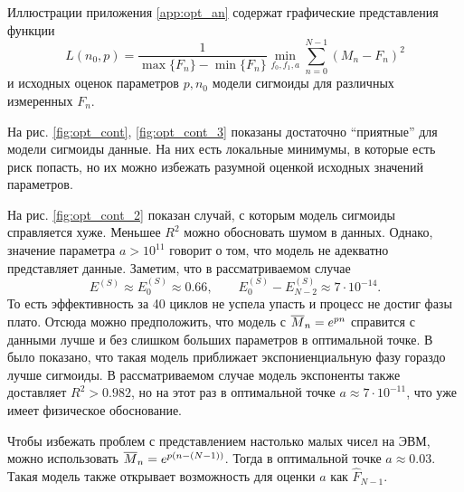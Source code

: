 Иллюстрации приложения \ref{app:opt_an} содержат графические представления
функции
\begin{equation}\label{eq:opt_fun}
  L(n_0,p)=\frac{1}{\max\{F_{n}\}-\min\{F_{n}\}}\min_{f_0,f_1,a}
  \sum_{n=0}^{N-1}(M_{n}-F_{n})^{2}
\end{equation}
и исходных оценок параметров $p,n_0$ модели сигмоиды для различных измеренных
$F_{n}$.

На рис. \ref{fig:opt_cont}, \ref{fig:opt_cont_3} показаны достаточно
\enquote{приятные} для модели сигмоиды данные. На них есть локальные минимумы,
в которые есть риск попасть, но их можно избежать разумной оценкой исходных
значений параметров.

На рис. \ref{fig:opt_cont_2} показан случай, с которым модель сигмоиды
справляется хуже. Меньшее $R^{2}$ можно обосновать шумом в данных. Однако,
значение параметра $a>10^{11}$ говорит о том, что модель не адекватно
представляет данные. Заметим, что в рассматриваемом случае
\[
  E^{(S)}\approx E^{(S)}_0\approx 0.66,\qquad
  E^{(S)}_{0}-E^{(S)}_{N-2}\approx 7\cdot 10^{-14}.
\]
То есть эффективность за 40 циклов не успела упасть и процесс не достиг фазы
плато. Отсюда можно предположить, что модель с $\overline{M}_{n}=e^{pn}$ справится с
данными лучше и без слишком больших параметров в оптимальной точке. В
\cite{zhaoComprehensiveAlgorithmQuantitative2005} было показано, что такая
модель приближает экспониенциальную фазу гораздо лучше сигмоиды. В
рассматриваемом случае модель экспоненты также доставляет $R^{2}>0.982$, но на
этот раз в оптимальной точке $a\approx 7\cdot 10^{-11}$, что уже имеет
физическое обоснование.

Чтобы избежать проблем с представлением настолько малых чисел на ЭВМ, можно
использовать $\overline{M}_{n}=e^{p(n-(N-1))}$. Тогда в оптимальной точке
$a\approx 0.03$. Такая модель также открывает возможность для оценки $a$ как
$\hat F_{N-1}$.

